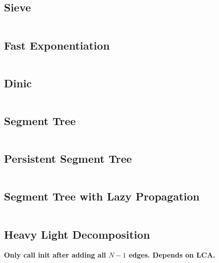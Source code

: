 \documentclass{article}
\begin{document}
\subsection{Sieve}
\inputminted[obeytabs=true,tabsize=4]{cpp}{code/sieve.cpp}
\subsection{Fast Exponentiation}
\inputminted[obeytabs=true,tabsize=4]{cpp}{code/fast_exp.cpp}
\subsection{Dinic}
\inputminted[obeytabs=true,tabsize=4]{cpp}{code/dinic.cpp}
\subsection{Segment Tree} 
\inputminted[obeytabs=true,tabsize=4]{cpp}{code/seg.cpp}
\subsection{Persistent Segment Tree} 
\inputminted[obeytabs=true,tabsize=4]{cpp}{code/persistentseg.cpp}
\subsection{Segment Tree with Lazy Propagation} 
\inputminted[obeytabs=true,tabsize=4]{cpp}{code/lazyseg.cpp}
\subsection{Heavy Light Decomposition} 
\textbf{Only call init after adding all $N-1$ edges. Depends on LCA.}
\inputminted[obeytabs=true,tabsize=4]{cpp}{code/hlp.cpp}
\end{document}
